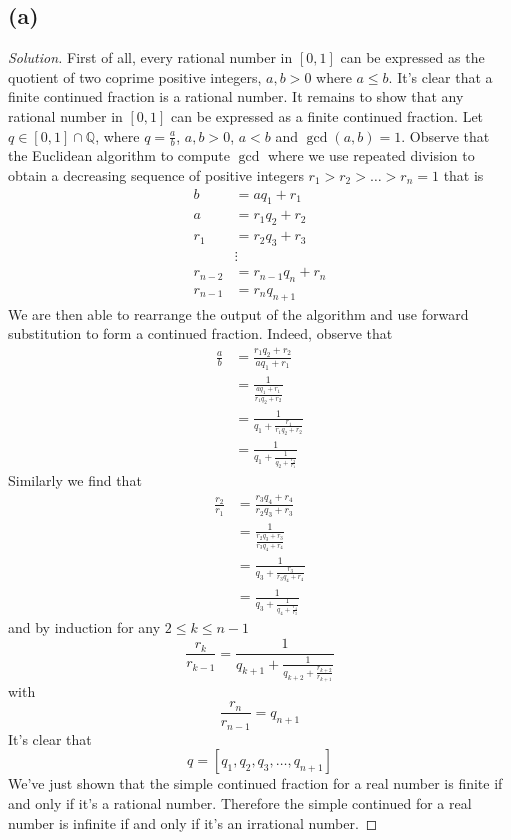 \documentclass[12pt]{article}
\begin{document}
\subsection*{(a)}
\begin{proof}[Solution]
	First of all, every rational number in $[0,1]$ can be expressed as the quotient of two coprime positive integers, $a,b > 0$ where $a \leq b$. It's clear that a finite continued fraction is a rational number. It remains to show that any rational number in $[0,1]$ can be expressed as a finite continued fraction. Let $q \in [0,1] \cap \mathbb{Q}$, where $q = \frac{a}{b}$, $a,b > 0$, $a<b$ and $\gcd(a,b) = 1$. Observe that the Euclidean algorithm to compute $\gcd$ where we use repeated division to obtain a decreasing sequence of positive integers $r_1 > r_2 > \ldots > r_n = 1$ that is 
	\begin{align*}
		b &= a q_1 + r_1 \\
		a &= r_1 q_2 + r_2 \\
		r_1 &= r_2 q_3 + r_3 \\
		&\vdots \\
		r_{n-2} &= r_{n-1} q_n + r_n \\
		r_{n-1} &= r_n q_{n+1}
	\end{align*} 
	We are then able to rearrange the output of the algorithm and use forward substitution to form a continued fraction. Indeed, observe that 
	\begin{align*}
		\frac{a}{b} &= \frac{r_1q_2 + r_2}{aq_1 + r_1}\\
					&= \frac{1}{\frac{aq_1 + r_1}{r_1q_2 + r_2}}\\
					&= \frac{1}{q_1 + \frac{r_1}{r_1q_2 + r_2}}\\
					&= \frac{1}{q_1 + \frac{1}{q_2 + \frac{r_2}{r_1}}}
	\end{align*}
	Similarly we find that
	\begin{align*}
		\frac{r_2}{r_1} &= \frac{r_3q_4+ r_4}{r_2q_3 + r_3}\\
					&= \frac{1}{\frac{r_2q_3 + r_3}{r_3q_4 + r_4}}\\
					&= \frac{1}{q_3 + \frac{r_3}{r_3q_4 + r_4}}\\
					&= \frac{1}{q_3 + \frac{1}{q_4 + \frac{r_4}{r_3}}}
	\end{align*}
	and by induction for any $2 \leq k \leq n-1$
	$$ \frac{r_k}{r_{k-1}} = \frac{1}{q_{k+1} + \frac{1}{q_{k+2}+ \frac{r_{k+2}}{r_{k+1}}}}$$
	with $$\frac{r_n}{r_{n-1}} = q_{n+1}$$
	It's clear that 
	$$q = [q_1,q_2,q_3,\ldots,q_{n+1}]$$
	We've just shown that the simple continued fraction for a real number is finite if and only if it's a rational number. Therefore the simple continued for a real number is infinite if and only if it's an irrational number. 
\end{proof}
\end{document}
